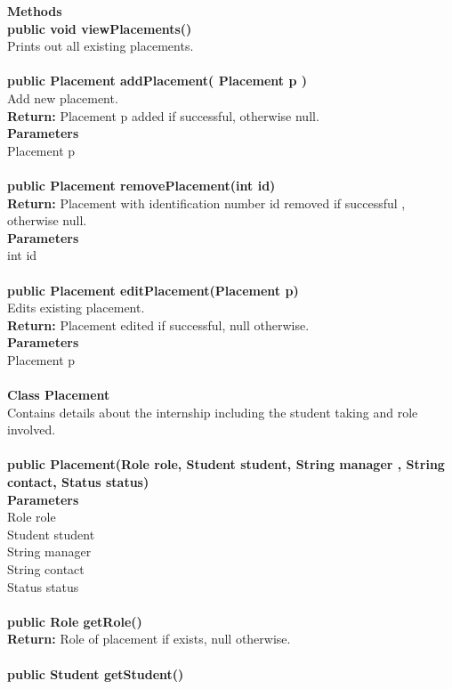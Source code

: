 \documentclass{l3deliverable}
\begin{document}
\textbf{Methods}\\
\textbf{public void viewPlacements()}\\
Prints out all existing placements.\\
\\
\textbf{public Placement addPlacement( Placement p )}\\
Add new placement.\\
\textbf{Return: }Placement p added if successful, otherwise null.\\
\textbf{Parameters}\\
Placement p\\
\\
\textbf{public Placement removePlacement(int id)}\\
\textbf{Return: }Placement with identification number id removed if successful , otherwise null.\\
\textbf{Parameters}\\
int id\\
\\
\textbf{public Placement editPlacement(Placement p) }\\
Edits existing placement.\\
\textbf{Return: }Placement edited if successful, null otherwise.\\
\textbf{Parameters}\\
Placement p\\
\\
\textbf{Class Placement}\\
Contains details about the internship including the student taking and role involved.\\
\\
\textbf{public Placement(Role role, Student student, String manager , String contact, Status status)}\\
\textbf{Parameters}\\
Role role\\
Student student\\
String manager\\
String contact\\
Status status\\
\\
\textbf{public Role getRole()}\\
\textbf{Return: }Role of placement if exists, null otherwise.\\
\\
\textbf{public Student getStudent()}\\
\end{document}
